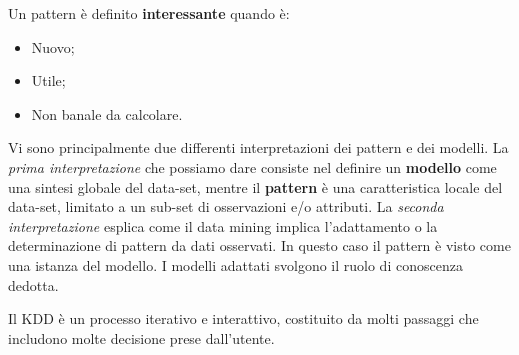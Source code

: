 \documentclass[a4paper]{extarticle}
\begin{document}
Un pattern è definito \textbf{interessante} quando è:
\begin{itemize}
	\item Nuovo;
	\item Utile;
	\item Non banale da calcolare.
\end{itemize}

Vi sono principalmente due differenti interpretazioni dei pattern e dei modelli.
La \textit{prima interpretazione} che possiamo dare consiste nel definire un \textbf{modello} come una sintesi globale del data-set, mentre il \textbf{pattern} è una caratteristica locale del data-set, limitato a un sub-set di osservazioni e/o attributi.
La \textit{seconda interpretazione} esplica come il data mining implica l'adattamento o la determinazione di pattern da dati osservati. In questo caso il pattern è visto come una istanza del modello. I modelli adattati svolgono il ruolo di conoscenza dedotta.

Il KDD è un processo iterativo e interattivo, costituito da molti passaggi che includono molte decisione prese dall'utente.

\begin{figure}[h]
\noindent
{}%
\end{figure}
\end{document}
